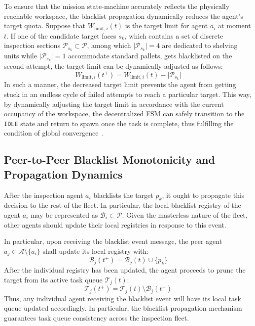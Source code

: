 To ensure that the mission state-machine accurately reflects the physically reachable workspace, the blacklist propagation dynamically reduces the agent's target quota. Suppose that $W_{\text{limit}, i}(t)$ is the target limit for agent $a_i$ at moment $t$. If one of the candidate target faces $s_k$, which contains a set of discrete inspection sections $\mathcal{P}_{s_k} \subset \mathcal{P}$, among which $\lvert\mathcal{P}_{s_k}\rvert = 4$ are dedicated to shelving units while $\lvert\mathcal{P}_{s_k}\rvert = 1$ accommodate standard pallets, gets blacklisted on the second attempt, the target limit can be dynamically adjusted as follows:
\begin{equation} \label{eq:dynamic_limit_reduction} 
W_{\text{limit}, i}(t^+) = W_{\text{limit}, i}(t) - \lvert\mathcal{P}_{s_k}\rvert 
\end{equation}
In such a manner, the decreased target limit prevents the agent from getting stuck in an endless cycle of failed attempts to reach a particular target. This way, by dynamically adjusting the target limit in accordance with the current occupancy of the workspace, the decentralized FSM can safely transition to the \texttt{IDLE} state and return to spawn once the task is complete, thus fulfilling the condition of global convergence~\cite{colledanchise2018behavior}.

\subsection{Peer-to-Peer Blacklist Monotonicity and Propagation Dynamics\label{sec:ch6_blacklist}}

After the inspection agent $a_i$ blacklists the target $p_k$, it ought to propagate this decision to the rest of the fleet. In particular, the local blacklist registry of the agent $a_i$ may be represented as $\mathcal{B}_i \subset \mathcal{P}$. Given the masterless nature of the fleet, other agents should update their local registries in response to this event.

In particular, upon receiving the blacklist event message, the peer agent $a_j \in \mathcal{A} \setminus \{a_i\}$ shall update its local registry with:
\begin{equation} \mathcal{B}_j(t^+) = \mathcal{B}_j(t) \cup \{ p_k \} \label{eq:blacklist_union_update} \end{equation}
After the individual registry has been updated, the agent proceeds to prune the target from its active task queue $\mathcal{T}_j(t)$:
\begin{equation} \mathcal{T}_j(t^+) = \mathcal{T}_j(t) \setminus \mathcal{B}_j(t^+) \label{eq:task_queue_pruning} \end{equation}
Thus, any individual agent receiving the blacklist event will have its local task queue updated accordingly. In particular, the blacklist propagation mechanism guarantees task queue consistency across the inspection fleet.


